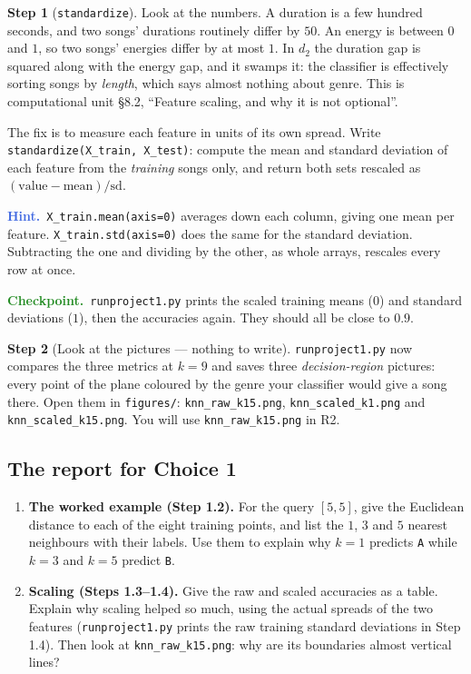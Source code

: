 \documentclass[11pt]{article}
\theoremstyle{definition}
\newtheorem{step}{Step}[section]
\newcommand{\hint}[1]{\par\smallskip\noindent
  {\small\sffamily\textcolor{RoyalBlue}{\textbf{Hint.}}\ #1}\par\smallskip}
\newcommand{\checkpoint}[1]{\par\smallskip\noindent
  {\small\sffamily\textcolor{ForestGreen}{\textbf{Checkpoint.}}\ #1}\par\smallskip}
\newcommand{\file}[1]{\texttt{#1}}
\begin{document}
\begin{step}[\texttt{standardize}]
Look at the numbers. A duration is a few hundred seconds, and two songs'
durations routinely differ by $50$. An energy is between $0$ and $1$, so two
songs' energies differ by at most $1$. In $d_2$ the duration gap is squared
along with the energy gap, and it swamps it: the classifier is effectively
sorting songs by \emph{length}, which says almost nothing about genre. This is
computational unit \S8.2, ``Feature scaling, and why it is not optional''.

The fix is to measure each feature in units of its own spread. Write
\texttt{standardize(X\_train, X\_test)}: compute the mean and standard
deviation of each feature from the \emph{training} songs only, and return both
sets rescaled as $(\text{value}-\text{mean})/\text{sd}$.
\hint{\texttt{X\_train.mean(axis=0)} averages down each column, giving one
mean per feature. \texttt{X\_train.std(axis=0)} does the same for the
standard deviation. Subtracting the one and dividing by the other, as whole
arrays, rescales every row at once.}
\checkpoint{\file{runproject1.py} prints the scaled training means ($0$) and standard
deviations ($1$), then the accuracies again. They should all be close to
$0.9$.}
\end{step}

\begin{step}[Look at the pictures --- nothing to write]
\file{runproject1.py} now compares the three metrics at $k=9$ and saves three
\emph{decision-region} pictures: every point of the plane coloured by the genre
your classifier would give a song there. Open them in \file{figures/}:
\file{knn\_raw\_k15.png}, \file{knn\_scaled\_k1.png} and
\file{knn\_scaled\_k15.png}. You will use \file{knn\_raw\_k15.png} in R2.
\end{step}

\subsection*{The report for Choice 1}

\begin{enumerate}[label=\textbf{R\arabic*.},leftmargin=2.6em,itemsep=6pt,topsep=4pt]
  \item \textbf{The worked example (Step 1.2).} For the query $[5,5]$, give the
        Euclidean distance to each of the eight training points, and list the
        $1$, $3$ and $5$ nearest neighbours with their labels. Use them to
        explain why $k=1$ predicts \texttt{A} while $k=3$ and $k=5$ predict
        \texttt{B}.
  \item \textbf{Scaling (Steps 1.3--1.4).} Give the raw and scaled accuracies
        as a table. Explain why scaling helped so much, using the actual
        spreads of the two features (\file{runproject1.py} prints the raw training
        standard deviations in Step 1.4). Then look at
        \file{knn\_raw\_k15.png}: why are its boundaries almost vertical
        lines?
\end{enumerate}
\end{document}
